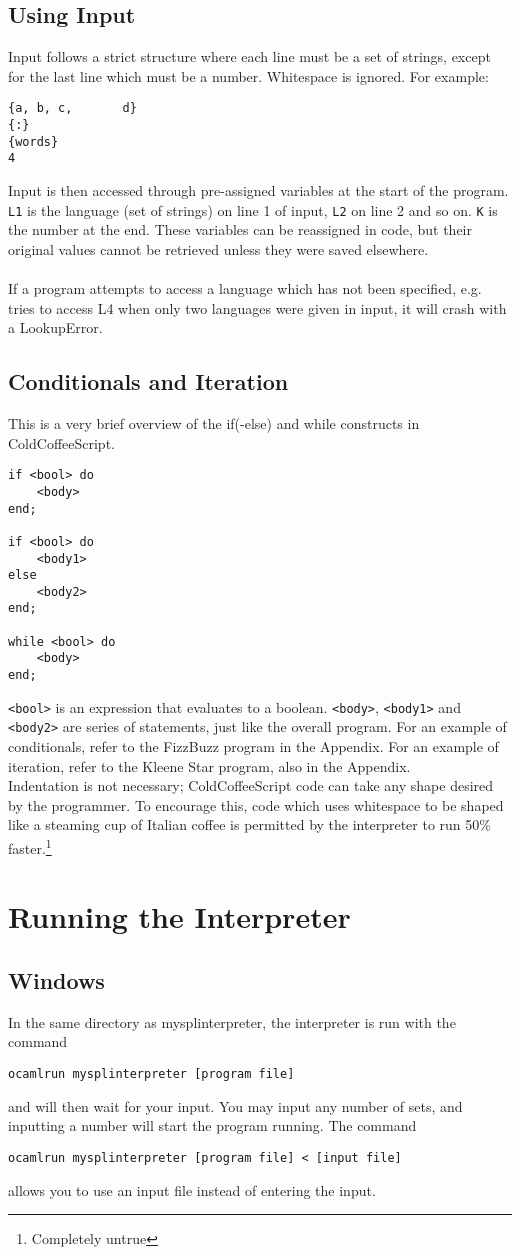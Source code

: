 \documentclass{article}
\begin{document}
\subsection{Using Input}
Input follows a strict structure where each line must be a set of strings, except for the last line which must be a number. Whitespace is ignored. For example:
\begin{lstlisting}
{a, b, c,       d}
{:}
{words}
4
\end{lstlisting}
Input is then accessed through pre-assigned variables at the start of the program. \lstinline|L1| is the language (set of strings) on line 1 of input, \lstinline|L2| on line 2 and so on. \lstinline|K| is the number at the end. These variables can be reassigned in code, but their original values cannot be retrieved unless they were saved elsewhere.\\\\
If a program attempts to access a language which has not been specified, e.g. tries to access L4 when only two languages were given in input, it will crash with a LookupError.
\subsection{Conditionals and Iteration}
This is a very brief overview of the if(-else) and while constructs in ColdCoffeeScript.
\begin{lstlisting}
if <bool> do
    <body>
end;

if <bool> do
    <body1>
else
    <body2>
end;

while <bool> do
    <body>
end;
\end{lstlisting}
\lstinline|<bool>| is an expression that evaluates to a boolean. \lstinline|<body>|, \lstinline|<body1>| and \lstinline|<body2>| are series of statements, just like the overall program. For an example of conditionals, refer to the FizzBuzz program in the Appendix. For an example of iteration, refer to the Kleene Star program, also in the Appendix.\\
Indentation is not necessary; ColdCoffeeScript code can take any shape desired by the programmer. To encourage this, code which uses whitespace to be shaped like a steaming cup of Italian coffee is permitted by the interpreter to run 50\% faster.\footnote{Completely untrue}
\section{Running the Interpreter}
\subsection{Windows}
In the same directory as mysplinterpreter, the interpreter is run with the command
\begin{lstlisting}
ocamlrun mysplinterpreter [program file]
\end{lstlisting}
and will then wait for your input. You may input any number of sets, and inputting a number will start the program running. The command
\begin{lstlisting}
ocamlrun mysplinterpreter [program file] < [input file]
\end{lstlisting}
allows you to use an input file instead of entering the input.
\end{document}
